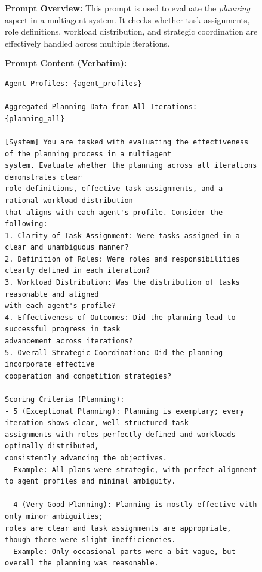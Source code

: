 \begin{figure}[htbp]
\centering
\begin{tcolorbox}[
    title=\textbf{Planning Evaluation Prompt},
    colback=blue!1!white,
    colframe=blue!50!black,
    fonttitle=\bfseries,
]
\small

\textbf{Prompt Overview:}  
This prompt is used to evaluate the \emph{planning} aspect in a multiagent system. 
It checks whether task assignments, role definitions, workload distribution, 
and strategic coordination are effectively handled across multiple iterations.

\vspace{2mm}

\textbf{Prompt Content (Verbatim):}
\begin{verbatim}
Agent Profiles: {agent_profiles}

Aggregated Planning Data from All Iterations:
{planning_all}

[System] You are tasked with evaluating the effectiveness of the planning process in a multiagent 
system. Evaluate whether the planning across all iterations demonstrates clear 
role definitions, effective task assignments, and a rational workload distribution 
that aligns with each agent's profile. Consider the following:
1. Clarity of Task Assignment: Were tasks assigned in a clear and unambiguous manner?
2. Definition of Roles: Were roles and responsibilities clearly defined in each iteration?
3. Workload Distribution: Was the distribution of tasks reasonable and aligned 
with each agent's profile?
4. Effectiveness of Outcomes: Did the planning lead to successful progress in task 
advancement across iterations?
5. Overall Strategic Coordination: Did the planning incorporate effective 
cooperation and competition strategies?

Scoring Criteria (Planning):
- 5 (Exceptional Planning): Planning is exemplary; every iteration shows clear, well-structured task 
assignments with roles perfectly defined and workloads optimally distributed, 
consistently advancing the objectives.
  Example: All plans were strategic, with perfect alignment to agent profiles and minimal ambiguity.

- 4 (Very Good Planning): Planning is mostly effective with only minor ambiguities; 
roles are clear and task assignments are appropriate, though there were slight inefficiencies.
  Example: Only occasional parts were a bit vague, but overall the planning was reasonable.


\end{verbatim}
\end{tcolorbox}
\end{figure}
